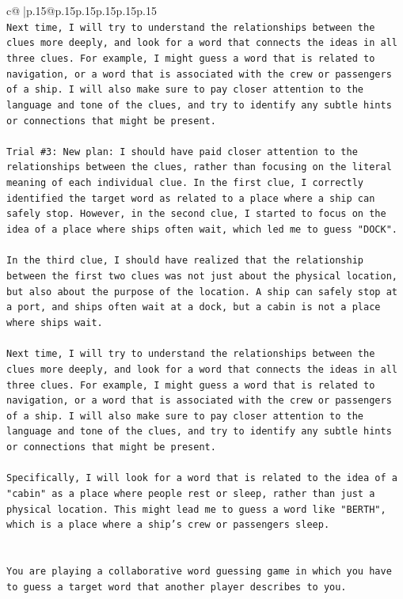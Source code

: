 \documentclass{article}
\begin{document}
{\begin{supertabular}{c@{$\;$}|p{.15\linewidth}@{}p{.15\linewidth}p{.15\linewidth}p{.15\linewidth}p{.15\linewidth}p{.15\linewidth}}
{{{\\ 
\texttt{Next time, I will try to understand the relationships between the clues more deeply, and look for a word that connects the ideas in all three clues. For example, I might guess a word that is related to navigation, or a word that is associated with the crew or passengers of a ship. I will also make sure to pay closer attention to the language and tone of the clues, and try to identify any subtle hints or connections that might be present.} \\
\\ 
\texttt{Trial \#3: New plan: I should have paid closer attention to the relationships between the clues, rather than focusing on the literal meaning of each individual clue. In the first clue, I correctly identified the target word as related to a place where a ship can safely stop. However, in the second clue, I started to focus on the idea of a place where ships often wait, which led me to guess "DOCK". } \\
\\ 
\texttt{In the third clue, I should have realized that the relationship between the first two clues was not just about the physical location, but also about the purpose of the location. A ship can safely stop at a port, and ships often wait at a dock, but a cabin is not a place where ships wait. } \\
\\ 
\texttt{Next time, I will try to understand the relationships between the clues more deeply, and look for a word that connects the ideas in all three clues. For example, I might guess a word that is related to navigation, or a word that is associated with the crew or passengers of a ship. I will also make sure to pay closer attention to the language and tone of the clues, and try to identify any subtle hints or connections that might be present. } \\
\\ 
\texttt{Specifically, I will look for a word that is related to the idea of a "cabin" as a place where people rest or sleep, rather than just a physical location. This might lead me to guess a word like "BERTH", which is a place where a ship's crew or passengers sleep.} \\
\\ 
\\ 
\texttt{You are playing a collaborative word guessing game in which you have to guess a target word that another player describes to you.} \\
\\ 
}}}
\end{supertabular}}
\end{document}
